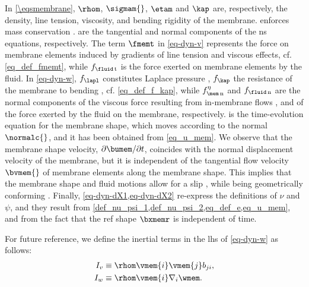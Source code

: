In \cref{\eqsmembrane}, $\rhom$, $\sigmam{}$, $\etam$ and $\kap$ are, respectively, the density, line tension, viscosity, and bending rigidity of the membrane.
 enforces mass conservation \cite{landauFluidMechanics1987}.
 are the tangential and normal components of the \ac{ns} equations, respectively.
The term $\fmemt$ in \cref{eq-dyn-v} represents the force on membrane elements induced by gradients of line tension and viscous effects, cf. \cref{eq_def_fmemt}, while $f_{\fluid\, \text{t}}$ is the force exerted on membrane elements by the fluid.
%
In \cref{eq-dyn-w}, $f_\lapl$ constitutes Laplace pressure \cite{degennesCapillarityWettingPhenomena2004,landauFluidMechanics1987},  $f_\kap$  the resistance of the membrane to bending \cite{helfrichElasticPropertiesLipid1973}, cf. \cref{eq_def_f_kap},  while $\fetamemn$ and $\fflun$ are  the  normal components of the viscous force resulting from in-membrane flows \cite{arroyoRelaxationDynamicsFluid2009i}, and of the force exerted by the fluid on the membrane, respectively.
%
 is the time-evolution equation for the membrane shape, which moves according to the normal $\normalc{}$, and it has been obtained from  \cref{eq_u_mem}.
We observe that the membrane shape velocity, $\partial \bumem / \partial t$, coincides with the normal displacement velocity of the membrane, but  it is independent of the tangential flow velocity $\bvmem{}$ of membrane elements along the membrane shape.
This implies that the membrane shape and fluid motions allow for a slip \cite{landauFluidMechanics1987}, while  being geometrically conforming \cite{kamenskyLectureNotesMAE}.
%
Finally, \cref{eq-dyn-dX1,eq-dyn-dX2} re-express the definitions of $\nu$ and $\psi$, and  they result from \cref{def_nu_psi_1,def_nu_psi_2,eq_def_e,eq_u_mem}, and from the fact that the \ac{ref} shape $\bxmemr$ is independent of time.


For future reference, we define the inertial terms \cite{landauFluidMechanics1987} in  the \ac{lhs} of \cref{eq-dyn-w} as follows:
\begin{align}
    \label{eq_def_I_v}
    I_v & \equiv  \rhom \vmem{i}  \vmem{j} b_{ji}, \\
    \label{eq_def_I_w}
    I_w & \equiv  \rhom \vmem{i} \nabla_i \wmem.
\end{align}

